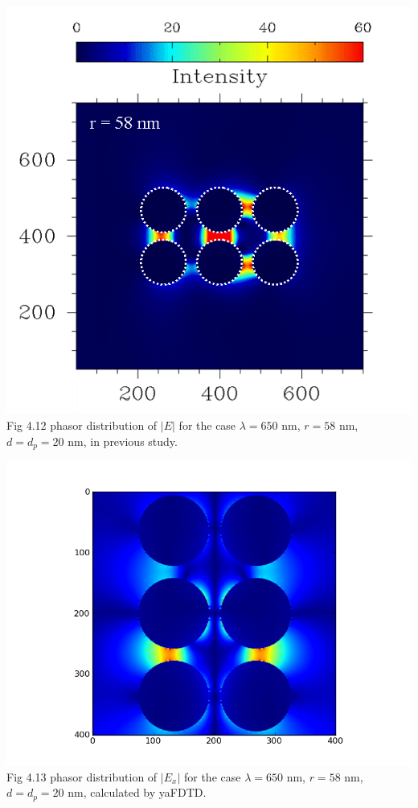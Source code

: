 \documentclass[openany]{book}
\begin{document}
\begin{center}
\includegraphics[scale=0.5]{images/r58.png}\\
Fig 4.12
phasor distribution of $|E|$ for the case $\lambda = 650$ nm, $r = 58$ nm, $d = d_p = 20$ nm, in previous study.
\end{center}

\begin{center}
\includegraphics[scale=0.8]{images/ex-r58.png}\\
Fig 4.13
phasor distribution of $|E_x|$ for the case $\lambda = 650$ nm, $r = 58$ nm, $d = d_p = 20$ nm, calculated by yaFDTD.
\end{center}
\end{document}
